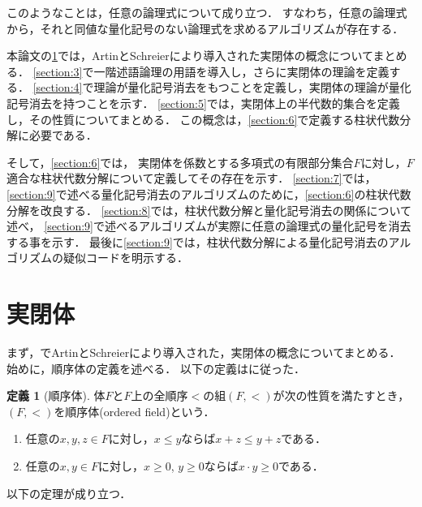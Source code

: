 \documentclass[uplatex, dvipdfmx]{jsarticle}
\numberwithin{equation}{section}
\theoremstyle{definition}
\newtheorem{definition}{定義}[section]
\begin{document}
     このようなことは，任意の論理式について成り立つ．
     すなわち，任意の論理式から，それと同値な量化記号のない論理式を求めるアルゴリズムが存在する．

     
     


     本論文の\cref{section:2}では，ArtinとSchreierにより導入された実閉体の概念についてまとめる．
     \cref{section:3}で一階述語論理の用語を導入し，さらに実閉体の理論を定義する．
     \cref{section:4}で理論が量化記号消去をもつことを定義し，実閉体の理論が量化記号消去を持つことを示す．
     \cref{section:5}では，実閉体上の半代数的集合を定義し，その性質についてまとめる．
     この概念は，\cref{section:6}で定義する柱状代数分解に必要である．

     そして，\cref{section:6}では，
     実閉体を係数とする多項式の有限部分集合$F$に対し，$F$適合な柱状代数分解について定義してその存在を示す．
     \cref{section:7}では，\cref{section:9}で述べる量化記号消去のアルゴリズムのために，\cref{section:6}の柱状代数分解を改良する．
     \cref{section:8}では，柱状代数分解と量化記号消去の関係について述べ，
     \cref{section:9}で述べるアルゴリズムが実際に任意の論理式の量化記号を消去する事を示す．
     最後に\cref{section:9}では，柱状代数分解による量化記号消去のアルゴリズムの疑似コードを明示する．

       
\section{実閉体}\label{section:2}

まず，\cite{MR3069467}でArtinとSchreierにより導入された，実閉体の概念についてまとめる．
始めに，順序体の定義を述べる．
以下の定義は\cite[Definition 1.1.1]{MR1659509}に従った．

\begin{definition}[順序体]
     体$F$と$F$上の全順序$<$の組$(F,<)$が次の性質を満たすとき，$(F,<)$を順序体(ordered field)という．
     \begin{enumerate}
          \item 任意の$x,y,z\in F$に対し，$x \leq y$ならば$x + z \leq y + z$である．
          \item 任意の$x,y \in F$に対し，$x \geq 0$, $y \geq 0$ならば$x \cdot y \geq 0$である．
     \end{enumerate}
\end{definition}

以下の定理が成り立つ．
\end{document}

